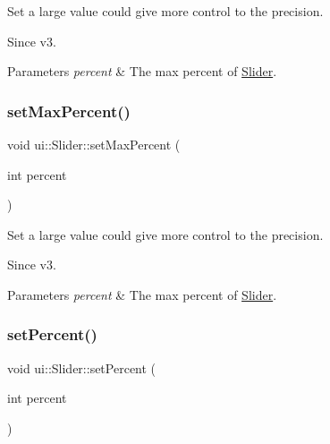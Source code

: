 Set a large value could give more control to the precision. \begin{DoxySince}{Since}
v3. 
\end{DoxySince}

\begin{DoxyParams}{Parameters}
{\em percent} & The max percent of \hyperlink{classui_1_1Slider}{Slider}. \\
\hline
\end{DoxyParams}
\mbox{\label{classui_1_1Slider_a08507a91d537eeb3b30596512ab3ac6e}} 
\subsubsection{\texorpdfstring{set\+Max\+Percent()}{setMaxPercent()}\hspace{0.1cm}{\footnotesize\ttfamily [2/2]}}
{\footnotesize\ttfamily void ui\+::\+Slider\+::set\+Max\+Percent (\begin{DoxyParamCaption}\item[{int}]{percent }\end{DoxyParamCaption})}

Set a large value could give more control to the precision. \begin{DoxySince}{Since}
v3. 
\end{DoxySince}

\begin{DoxyParams}{Parameters}
{\em percent} & The max percent of \hyperlink{classui_1_1Slider}{Slider}. \\
\hline
\end{DoxyParams}
\mbox{\label{classui_1_1Slider_a720aa3007f2716699790494cd6731c6c}} 
\subsubsection{\texorpdfstring{set\+Percent()}{setPercent()}\hspace{0.1cm}{\footnotesize\ttfamily [1/2]}}
{\footnotesize\ttfamily void ui\+::\+Slider\+::set\+Percent (\begin{DoxyParamCaption}\item[{int}]{percent }\end{DoxyParamCaption})}

